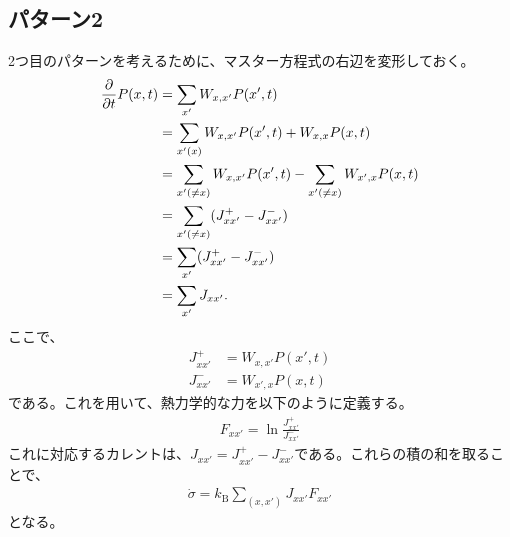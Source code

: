 \documentclass[a4paper,11pt]{jsarticle}
\numberwithin{equation}{section}
\begin{document}
\subsection{パターン2}
2つ目のパターンを考えるために、マスター方程式の右辺を変形しておく。
\begin{align}
    \pdv{t}P(x,t) &= \sum_{x'}W_{x,x'}P(x',t)\\
    &= \sum_{x'(x)}W_{x,x'}P(x',t) + W_{x,x}P(x,t)\\
    &= \sum_{x'(\neq x)}W_{x,x'}P(x',t) - \sum_{x'(\neq x)}W_{x',x}P(x,t)\\
    &= \sum_{x'(\neq x)}(J^{+}_{xx'} - J^{-}_{xx'})\\
    &= \sum_{x'}(J^{+}_{xx'} - J^{-}_{xx'})\\
    &= \sum_{x'}J_{xx'}.
\end{align}
ここで、
\begin{align}
    J^{+}_{xx'} &= W_{x,x'}P(x',t)\\
    J^{-}_{xx'} &= W_{x',x}P(x,t)
\end{align}
である。これを用いて、熱力学的な力を以下のように定義する。
\begin{align}
    F_{xx'} = \ln \frac{J^{+}_{xx'}}{J^{-}_{xx'}}
\end{align}
これに対応するカレントは、$J_{xx'} = J^{+}_{xx'} - J^{-}_{xx'}$である。これらの積の和を取ることで、
\begin{align}
    \dot{\sigma} =k_{\text{B}} \sum_{(x,x')} J_{xx'} F_{xx'}
\end{align}
となる。
\end{document}
